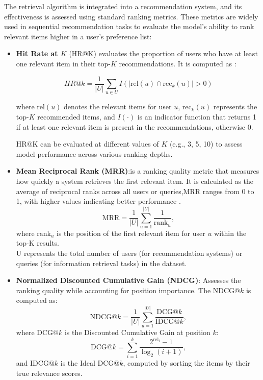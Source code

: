 \documentclass[Afour,sageh,times]{sagej}
\begin{document}
The retrieval algorithm is integrated into a recommendation system, and its effectiveness is assessed using standard ranking metrics. These metrics are widely used in sequential recommendation tasks to evaluate the model's ability to rank relevant items higher in a user's preference list:
\begin{itemize}
	\item \textbf {Hit Rate at \( K \)} (HR@K) evaluates the proportion of users who have at least one relevant item in their top-\( K \) recommendations. It is computed as \cite{eviden2025mrr}:
	
	\begin{equation}
	HR@k = \frac{1}{|U|} \sum_{u \in U} I(|\text{rel}(u) \cap \text{rec}_k(u)| > 0)
	\end{equation}
	
	where \( \text{rel}(u) \) denotes the relevant items for user \( u \), \( \text{rec}_k(u) \) represents the top-\( K \) recommended items, and \( I(\cdot) \) is an indicator function that returns 1 if at least one relevant item is present in the recommendations, otherwise 0.  
	
	HR@K can be evaluated at different values of \( K \) (e.g., 3, 5, 10) to assess model performance across various ranking depths.
	
	\item \textbf{Mean Reciprocal Rank (MRR)}:is a ranking quality metric that measures how quickly a system retrieves the first relevant item. It is calculated as the average of reciprocal ranks across all users or queries,MRR ranges from 0 to 1, with higher values indicating better performance \cite{eviden2025mrr}.
	\begin{equation}
	\text{MRR} = \frac{1}{|U|} \sum_{u=1}^{|U|} \frac{1}{\text{rank}_u},
	\end{equation}
	where \( \text{rank}_u \) is the position of the first relevant item for user \( u \) within the top-K results. \\ 
	U represents the total number of users (for recommendation systems) or queries (for information retrieval tasks) in the dataset.
	
	\item \textbf{Normalized Discounted Cumulative Gain (NDCG)}: Assesses the ranking quality while accounting for position importance. The NDCG@\( k \) is computed as:\cite{eviden2025mrr}
	\begin{equation}
	\text{NDCG@}k = \frac{1}{|U|} \sum_{u=1}^{|U|} \frac{\text{DCG@}k}{\text{IDCG@}k},
	\end{equation}
	where \( \text{DCG@}k \) is the Discounted Cumulative Gain at position \( k \):
	\begin{equation}
	\text{DCG@}k = \sum_{i=1}^{k} \frac{2^{\text{rel}_i} - 1}{\log_2(i + 1)},
	\end{equation}
	and \( \text{IDCG@}k \) is the Ideal DCG@\( k \), computed by sorting the items by their true relevance scores.
\end{itemize}  
\end{document}
